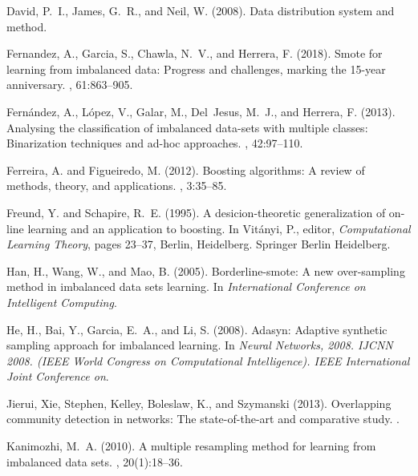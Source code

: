 \documentclass[runningheads]{llncs}
\begin{document}
\begin{thebibliography}{8}
  David, P.~I., James, G.~R., and Neil, W. (2008).
  \newblock Data distribution system and method.
  
  Fernandez, A., Garcia, S., Chawla, N.~V., and Herrera, F. (2018).
  \newblock Smote for learning from imbalanced data: Progress and challenges,
    marking the 15-year anniversary.
  , 61:863--905.
  
  Fernández, A., López, V., Galar, M., Del~Jesus, M.~J., and Herrera, F.
    (2013).
  \newblock Analysing the classification of imbalanced data-sets with multiple
    classes: Binarization techniques and ad-hoc approaches.
  , 42:97–110.
  
  Ferreira, A. and Figueiredo, M. (2012).
  \newblock Boosting algorithms: A review of methods, theory, and applications.
  , 3:35--85.
  
  Freund, Y. and Schapire, R.~E. (1995).
  \newblock A desicion-theoretic generalization of on-line learning and an
    application to boosting.
  \newblock In Vit{\'a}nyi, P., editor, {\em Computational Learning Theory},
    pages 23--37, Berlin, Heidelberg. Springer Berlin Heidelberg.
  
  Han, H., Wang, W., and Mao, B. (2005).
  \newblock Borderline-smote: A new over-sampling method in imbalanced data sets
    learning.
  \newblock In {\em International Conference on Intelligent Computing}.
  
  He, H., Bai, Y., Garcia, E.~A., and Li, S. (2008).
  \newblock Adasyn: Adaptive synthetic sampling approach for imbalanced learning.
  \newblock In {\em Neural Networks, 2008. IJCNN 2008. (IEEE World Congress on
    Computational Intelligence). IEEE International Joint Conference on}.
  
  Jierui, Xie, Stephen, Kelley, Boleslaw, K., and Szymanski (2013).
  \newblock Overlapping community detection in networks: The state-of-the-art and
    comparative study.
  .
  
  Kanimozhi, M.~A. (2010).
  \newblock A multiple resampling method for learning from imbalanced data sets.
  , 20(1):18--36.
  

\end{thebibliography}
\end{document}
